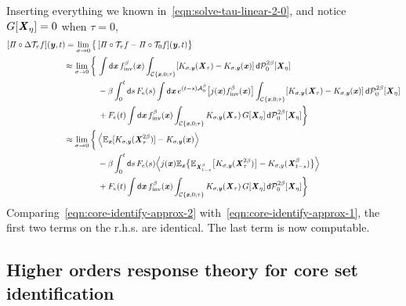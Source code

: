 \documentclass[aip,jcp,a4paper,reprint,onecolumn]{revtex4-1}
\newcommand{\vect}[1]{\textbf{\textit{#1}}}
\newcommand{\dd}{\textsf{d}}
\newcommand{\inv}{\textrm{inv}}
\newcommand{\mh}{\mathcal H}
\newcommand{\mt}{\mathcal T}
\newcommand{\mc}{\mathcal C}
\newcommand{\proj}{\mathit\Pi}
\newcommand{\fwg}{{\mathcal A}}
\begin{document}
Inserting everything we known in~\eqref{eqn:solve-tau-linear-2-0},
and notice $G[\vect X_\eta] = 0$ when $\tau = 0$,
\begin{align}\nonumber
  [\proj\circ\Delta\mt_\tau f](\vect y, t)
  =
  \lim_{\sigma \rightarrow 0}
  \big\{
  &\,
  [\proj\circ\mt_\tau f - \proj\circ\mt_0 f](\vect y, t)
  \big\}\\\nonumber
  \approx
  \lim_{\sigma \rightarrow 0}
  \bigg\{
  &\,
  \int \dd \vect x\,
  f_\inv^\beta(\vect x)
  \int_{\mc\{\vect x,0;\tau\}}
  [K_{\sigma,\vect y}(\vect X_\tau)
  -K_{\sigma,\vect y}(\vect x)]  \,
  \dd \mathcal P^{2\beta}_0[\vect X_\eta]\\\nonumber
  &\,-
  \beta
  \int_0^t\dd s\, F_e(s)
  \int \dd \vect x\,
  e^{(t-s)\fwg_0^\beta}
  \big[
  j(\vect x)
  f_\inv^\beta(\vect x)
  \big]
  \int_{\mc\{\vect x,0;\tau\}}
  [K_{\sigma,\vect y}(\vect X_\tau)
  -K_{\sigma,\vect y}(\vect x)]  \,
  \dd \mathcal P^{2\beta}_0[\vect X_\eta]\\\nonumber
  &\,+
  F_e(t)
  \int \dd \vect x\,
  f_\inv^\beta(\vect x)
  \int_{\mc\{\vect x,0;\tau\}}
  K_{\sigma,\vect y}(\vect X_\tau)
  \,G[\vect X_\eta]\,
  \dd \mathcal P^{2\beta}_0[\vect X_\eta]
  \bigg\}\\\nonumber
  \approx
  \lim_{\sigma \rightarrow 0}
  \bigg\{
  &\,
  \Big\langle
  \mathbb E_{\vect x}[K_{\sigma,\vect y}(\vect X_\tau^{2\beta})]
  -
  K_{\sigma,\vect y}(\vect x)
  \Big\rangle\\\nonumber
  &\,
  - \beta
  \int_0^t\dd s\, F_e(s)
  \Big\langle
  j(\vect x)
  \mathbb E_{\vect x} \big\{
  \mathbb E_{\vect X^\beta_{t-s}}\big[
  K_{\sigma, \vect y}(\vect X^{2\beta}_\tau)
  \big]
  -
  K_{\sigma, y}(\vect X^\beta_{t-s})
  \big\}
  \Big\rangle\\\label{eqn:core-identify-approx-2}
  &\,+
  F_e(t)
  \int \dd \vect x\,
  f_\inv^\beta(\vect x)
  \int_{\mc\{\vect x,0;\tau\}}
  K_{\sigma,\vect y}(\vect X_\tau)
  \,G[\vect X_\eta]\,
  \dd \mathcal P^{2\beta}_0[\vect X_\eta]
  \bigg\}
\end{align}
Comparing~\eqref{eqn:core-identify-approx-2}
with~\eqref{eqn:core-identify-approx-1}, the first
two terms on the r.h.s. are identical. 
The last term is now computable.



\subsection{Higher orders response theory for core set identification}
\end{document}
